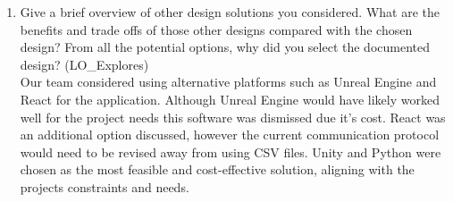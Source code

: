 \documentclass[12pt, titlepage]{article}
\begin{document}
\begin{enumerate}
  \item Give a brief overview of other design solutions you considered.  What
  are the benefits and trade offs of those other designs compared with the chosen
  design?  From all the potential options, why did you select the documented design?
  (LO\_Explores)
  \\
  Our team considered using alternative platforms such as Unreal Engine and React for the application. 
  Although Unreal Engine would have likely worked well for the project needs this software was dismissed due it's cost. 
  React was an additional option discussed, however the current communication protocol would need to be revised away from using CSV files.
  Unity and Python were chosen as the most feasible and cost-effective solution, aligning with the projects constraints and needs. 
\end{enumerate}
\end{document}
